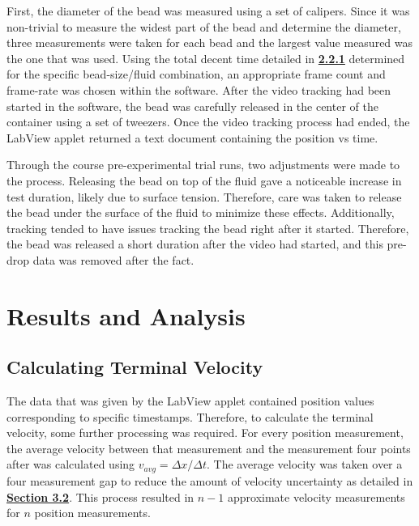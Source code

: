 \documentclass[
	letterpaper
	12pt
]{template}
\newcommand{\bref}[2]{\textbf{\hyperref[#1]{#2}}}
\begin{document}
First, the diameter of the bead was measured using a set of calipers. Since it was non-trivial to measure the widest part of the bead and determine the diameter, three measurements were taken for each bead and the largest value measured was the one that was used. Using the total decent time detailed in \bref{sec::timeEst}{2.2.1} determined for the specific bead-size/fluid combination, an appropriate frame count and frame-rate was chosen within the software. After the video tracking had been started in the software, the bead was carefully released in the center of the container using a set of tweezers. Once the video tracking process had ended, the LabView applet returned a text document containing the position vs time.
\vspace{\baselineskip}

Through the course pre-experimental trial runs, two adjustments were made to the process. Releasing the bead on top of the fluid gave a noticeable increase in test duration, likely due to surface tension. Therefore, care was taken to release the bead under the surface of the fluid to minimize these effects. Additionally, tracking tended to have issues tracking the bead right after it started. Therefore, the bead was released a short duration after the video had started, and this pre-drop data was removed after the fact.
\section{Results and Analysis}
\subsection{Calculating Terminal Velocity}

The data that was given by the LabView applet contained position values corresponding to specific timestamps. Therefore, to calculate the terminal velocity, some further processing was required. For every position measurement, the average velocity between that measurement and the measurement four points after was calculated using $v_{avg} = \Delta x/ \Delta t$. The average velocity was taken over a four measurement gap to reduce the amount of velocity uncertainty as detailed in \bref{sec::uncertainty}{Section 3.2}. This process resulted in $n-1$ approximate velocity measurements for $n$ position measurements. \vspace{\baselineskip}
\end{document}
